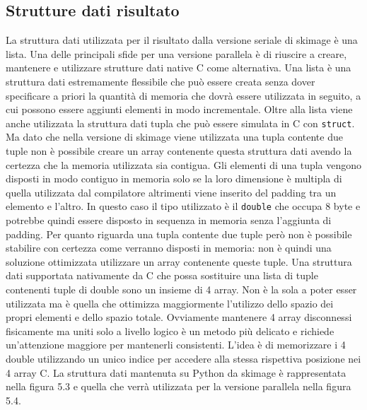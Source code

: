 \documentclass[12pt,a4paper]{report}
\begin{document}
\subsection{Strutture dati risultato}
La struttura dati utilizzata per il risultato dalla versione seriale di skimage è una lista. Una delle principali sfide per una versione parallela è di riuscire a creare, mantenere e utilizzare strutture dati native C come alternativa. 
Una lista è una struttura dati estremamente flessibile che può essere creata senza dover specificare a priori la quantità di memoria che dovrà essere utilizzata in seguito, a cui possono essere aggiunti elementi in modo incrementale. 
Oltre alla lista viene anche utilizzata la struttura dati tupla che può essere simulata in C con \verb|struct|. Ma dato che nella versione di skimage viene utilizzata una tupla contente due tuple non è possibile creare un array contenente questa struttura dati avendo la certezza che la memoria utilizzata sia contigua. Gli elementi di una tupla vengono disposti in modo contiguo in memoria solo se la loro dimensione è multipla di quella utilizzata dal compilatore altrimenti viene inserito del padding tra un elemento e l'altro. In questo caso il tipo utilizzato è il \verb|double| che occupa 8 byte e potrebbe quindi essere disposto in sequenza in memoria senza l'aggiunta di padding. Per quanto riguarda una tupla contente due tuple però non è possibile stabilire con certezza come verranno disposti in memoria: non è quindi una soluzione ottimizzata utilizzare un array contenente queste tuple. \newline
Una struttura dati supportata nativamente da C che possa sostituire una lista di tuple contenenti tuple di double sono un insieme di 4 array. Non è la sola a poter esser utilizzata ma è quella che ottimizza maggiormente l'utilizzo dello spazio dei propri elementi e dello spazio totale. Ovviamente mantenere 4 array disconnessi fisicamente ma uniti solo a livello logico è un metodo più delicato e richiede un'attenzione maggiore per mantenerli consistenti. L'idea è di memorizzare i 4 double utilizzando un unico indice per accedere alla stessa rispettiva posizione nei 4 array C. \newline
La struttura dati mantenuta su Python da skimage è rappresentata nella figura 5.3 e quella che verrà utilizzata per la versione parallela nella figura 5.4. \newline
\end{document}
